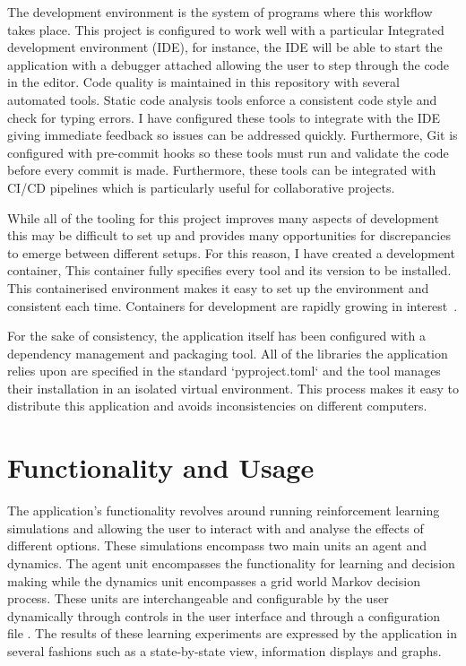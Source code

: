 \documentclass[]{final_report}
\begin{document}
The development environment is the system of programs where this workflow takes place. This project is configured to work well with a particular Integrated development environment (IDE), for instance, the IDE will be able to start the application with a debugger attached allowing the user to step through the code in the editor. Code quality is maintained in this repository with several automated tools. Static code analysis tools enforce a consistent code style and check for typing errors. I have configured these tools to integrate with the IDE giving immediate feedback so issues can be addressed quickly. Furthermore, Git is configured with pre-commit hooks so these tools must run and validate the code before every commit is made. Furthermore, these tools can be integrated with CI/CD pipelines which is particularly useful for collaborative projects.

While all of the tooling for this project improves many aspects of development this may be difficult to set up and provides many opportunities for discrepancies to emerge between different setups. For this reason, I have created a development container, This container fully specifies every tool and its version to be installed. This containerised environment makes it easy to set up the environment and consistent each time. Containers for development are rapidly growing in interest~\cite{developmentContainers}. 

For the sake of consistency, the application itself has been configured with a dependency management and packaging tool. All of the libraries the application relies upon are specified in the standard `pyproject.toml` and the tool manages their installation in an isolated virtual environment. This process makes it easy to distribute this application and avoids inconsistencies on different computers.

\section{Functionality and Usage}

The application's functionality revolves around running reinforcement learning simulations and allowing the user to interact with and analyse the effects of different options. These simulations encompass two main units an agent and dynamics. The agent unit encompasses the functionality for learning and decision making while the dynamics unit encompasses a grid world Markov decision process. These units are interchangeable and configurable by the user dynamically through controls in the user interface and through a configuration file . The results of these learning experiments are expressed by the application in several fashions such as a state-by-state view, information displays and graphs.
\end{document}
